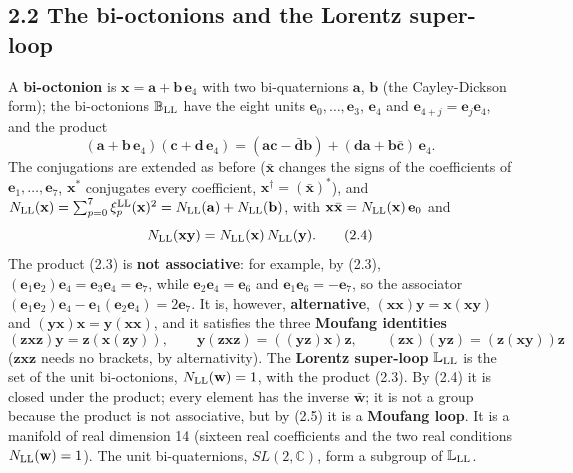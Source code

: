 \documentclass[
  10pt,
]{article}
\begin{document}
\hypertarget{the-bi-octonions-and-the-lorentz-super-loop}{%
\subsection{2.2 The bi-octonions and the Lorentz
super-loop}\label{the-bi-octonions-and-the-lorentz-super-loop}}

A \textbf{bi-octonion} is \(\mathbf x=\mathbf a+\mathbf b\,\mathbf e_4\)
with two bi-quaternions \(\mathbf a\), \(\mathbf b\) (the Cayley-Dickson
form); the bi-octonions \(\mathbb B_{\rm LL}\) have the eight units
\(\mathbf e_0,\dots,\mathbf e_3\), \(\mathbf e_4\) and
\(\mathbf e_{4+j}=\mathbf e_j\mathbf e_4\), and the product
\[(\mathbf a+\mathbf b\,\mathbf e_4)(\mathbf c+\mathbf d\,\mathbf e_4)=(\mathbf a\mathbf c-\bar{\mathbf d}\mathbf b)+(\mathbf d\mathbf a+\mathbf b\bar{\mathbf c})\,\mathbf e_4.\tag{2.3}\]
The conjugations are extended as before (\(\bar{\mathbf x}\) changes the
signs of the coefficients of \(\mathbf e_1,\dots,\mathbf e_7\),
\(\mathbf x^*\) conjugates every coefficient,
\(\mathbf x^\dagger=(\bar{\mathbf x})^*\)), and
\(N_{\rm LL}(\mathbf x)=\sum_{p=0}^7\xi^{\rm LL}_p(\mathbf x)^2=N_{\rm LL}(\mathbf a)+N_{\rm LL}(\mathbf b)\),
with \(\mathbf x\bar{\mathbf x}=N_{\rm LL}(\mathbf x)\,\mathbf e_0\) and
\[N_{\rm LL}(\mathbf x\mathbf y)=N_{\rm LL}(\mathbf x)\,N_{\rm LL}(\mathbf y).\tag{2.4}\]
The product (2.3) is \textbf{not associative}: for example, by (2.3),
\((\mathbf e_1\mathbf e_2)\mathbf e_4=\mathbf e_3\mathbf e_4=\mathbf e_7\),
while \(\mathbf e_2\mathbf e_4=\mathbf e_6\) and
\(\mathbf e_1\mathbf e_6=-\mathbf e_7\), so the associator
\((\mathbf e_1\mathbf e_2)\mathbf e_4-\mathbf e_1(\mathbf e_2\mathbf e_4)=2\mathbf e_7\).
It is, however, \textbf{alternative},
\((\mathbf x\mathbf x)\mathbf y=\mathbf x(\mathbf x\mathbf y)\) and
\((\mathbf y\mathbf x)\mathbf x=\mathbf y(\mathbf x\mathbf x)\), and it
satisfies the three \textbf{Moufang identities}
\[(\mathbf z\mathbf x\mathbf z)\mathbf y=\mathbf z(\mathbf x(\mathbf z\mathbf y)),\qquad\mathbf y(\mathbf z\mathbf x\mathbf z)=((\mathbf y\mathbf z)\mathbf x)\mathbf z,\qquad(\mathbf z\mathbf x)(\mathbf y\mathbf z)=(\mathbf z(\mathbf x\mathbf y))\mathbf z\tag{2.5}\]
(\(\mathbf z\mathbf x\mathbf z\) needs no brackets, by alternativity).
The \textbf{Lorentz super-loop} \(\mathbb L_{\rm LL}\) is the set of the
unit bi-octonions, \(N_{\rm LL}(\mathbf w)=1\), with the product (2.3).
By (2.4) it is closed under the product; every element has the inverse
\(\bar{\mathbf w}\); it is not a group because the product is not
associative, but by (2.5) it is a \textbf{Moufang loop}. It is a
manifold of real dimension 14 (sixteen real coefficients and the two
real conditions \(N_{\rm LL}(\mathbf w)=1\)). The unit bi-quaternions,
\(SL(2,\mathbb C)\), form a subgroup of \(\mathbb L_{\rm LL}\).
\end{document}
